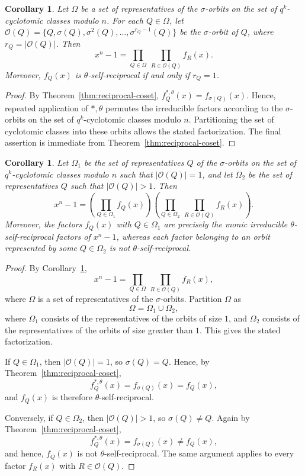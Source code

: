 \documentclass[pdflatex,sn-mathphys-num]{sn-jnl}%
\theoremstyle{thmstyleone}%
\newtheorem{corollary}[theorem]{Corollary}%
\theoremstyle{thmstyletwo}%
\theoremstyle{thmstylethree}%
\begin{document}
\begin{corollary}\label{cor:factorization-orbits}
Let $\Omega$ be a set of representatives of the $\sigma$-orbits on the set of $q^k$-cyclotomic classes modulo $n$. For each $Q\in \Omega$, let $
\mathcal O(Q)=\{Q,\sigma(Q),\sigma^2(Q),\dots,\sigma^{r_Q-1}(Q)\}$
be the $\sigma$-orbit of $Q$, where $r_Q=|\mathcal O(Q)|$. Then
\[
x^n-1=\prod_{Q\in \Omega}\ \prod_{R\in \mathcal O(Q)} f_R(x).
\]
Moreover, $f_Q(x)$ is $\theta$-self-reciprocal if and only if $r_Q=1$.
\end{corollary}

\begin{proof}
By Theorem~\ref{thm:reciprocal-coset},
$
f_Q^{\ast,\theta}(x)=f_{\sigma(Q)}(x)$.
Hence,  repeated application of $\ast,\theta$ permutes the irreducible factors according to the $\sigma$-orbits on the set of $q^k$-cyclotomic classes modulo $n$. Partitioning the set of cyclotomic classes into these orbits allows the stated factorization. The final assertion is immediate from Theorem~\ref{thm:reciprocal-coset}.
\end{proof}

\begin{corollary}\label{cor:factorization-separate}
Let $\Omega_1$ be the set of representatives $Q$ of the $\sigma$-orbits on the set of $q^k$-cyclotomic classes modulo $n$ such that $|\mathcal O(Q)|=1$, and let $\Omega_2$ be the set of representatives $Q$ such that $|\mathcal O(Q)|>1$. Then
\[
x^n-1=
\left(\prod_{Q\in \Omega_1} f_Q(x)\right)
\left(\prod_{Q\in \Omega_2}\ \prod_{R\in \mathcal O(Q)} f_R(x)\right).
\]
Moreover, the factors $f_Q(x)$ with $Q\in \Omega_1$ are precisely the monic irreducible $\theta$-self-reciprocal factors of $x^n-1$, whereas each factor belonging to an orbit represented by some $Q\in \Omega_2$ is not $\theta$-self-reciprocal.
\end{corollary}

\begin{proof}
By Corollary~\ref{cor:factorization-orbits},
\[
x^n-1=\prod_{Q\in \Omega}\ \prod_{R\in \mathcal O(Q)} f_R(x),
\]
where $\Omega$ is a set of representatives of the $\sigma$-orbits. Partition $\Omega$ as
\[
\Omega=\Omega_1\cup \Omega_2,
\]
where $\Omega_1$ consists of the representatives of the orbits of size $1$, and $\Omega_2$ consists of the representatives of the orbits of size greater than $1$. This gives the stated factorization.

If $Q\in \Omega_1$, then $|\mathcal O(Q)|=1$, so $\sigma(Q)=Q$. Hence, by Theorem~\ref{thm:reciprocal-coset},
\[
f_Q^{\ast,\theta}(x)=f_{\sigma(Q)}(x)=f_Q(x),
\]
and  $f_Q(x)$ is therefore $\theta$-self-reciprocal.

Conversely, if $Q\in \Omega_2$, then $|\mathcal O(Q)|>1$, so $\sigma(Q)\neq Q$. Again by Theorem~\ref{thm:reciprocal-coset},
\[
f_Q^{\ast,\theta}(x)=f_{\sigma(Q)}(x)\neq f_Q(x),
\]
and hence, $f_Q(x)$ is not $\theta$-self-reciprocal. The same argument applies to every factor $f_R(x)$ with $R\in \mathcal O(Q)$.
\end{proof}
\end{document}
